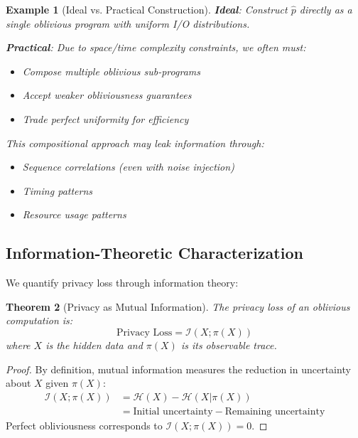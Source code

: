 \documentclass[11pt,final,hidelinks]{article}
\newtheorem{theorem}{Theorem}[section]
\newtheorem{example}[theorem]{Example}
\newcommand{\Pattern}[1]{\pi(#1)}
\newcommand{\Entropy}[1]{\mathcal{H}(#1)}
\newcommand{\MutualInfo}[2]{\mathcal{I}(#1; #2)}
\begin{document}
\begin{example}[Ideal vs. Practical Construction]
\textbf{Ideal}: Construct $\hat{p}$ directly as a single oblivious program with uniform I/O distributions.

\textbf{Practical}: Due to space/time complexity constraints, we often must:
\begin{itemize}
    \item Compose multiple oblivious sub-programs
    \item Accept weaker obliviousness guarantees
    \item Trade perfect uniformity for efficiency
\end{itemize}
This compositional approach may leak information through:
\begin{itemize}
    \item Sequence correlations (even with noise injection)
    \item Timing patterns
    \item Resource usage patterns
\end{itemize}
\end{example}

\subsection{Information-Theoretic Characterization}

We quantify privacy loss through information theory:

\begin{theorem}[Privacy as Mutual Information]
The privacy loss of an oblivious computation is:
\begin{equation}
\text{Privacy Loss} = \MutualInfo{X}{\Pattern{X}}
\end{equation}
where $X$ is the hidden data and $\Pattern{X}$ is its observable trace.
\end{theorem}

\begin{proof}
By definition, mutual information measures the reduction in uncertainty about $X$ given $\Pattern{X}$:
\begin{align}
\MutualInfo{X}{\Pattern{X}} &= \Entropy{X} - \Entropy{X|\Pattern{X}} \\
&= \text{Initial uncertainty} - \text{Remaining uncertainty}
\end{align}
Perfect obliviousness corresponds to $\MutualInfo{X}{\Pattern{X}} = 0$.
\end{proof}
\end{document}
